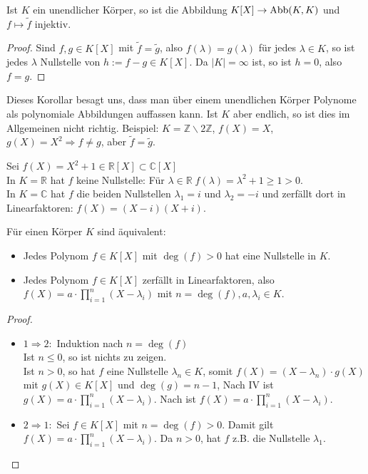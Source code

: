 \begin{conclusion}
	Ist $K$ ein unendlicher Körper, so ist die Abbildung $K[X] \to \operatorname{Abb}(K,K)$ und $f \mapsto
	\tilde f$ injektiv.
\end{conclusion}
\begin{proof}
	Sind $f,g \in K[X]$ mit $\tilde f = \tilde g$, also $f(\lambda)=g(\lambda)$ für jedes $\lambda \in K$, so ist
	jedes $\lambda$ Nullstelle von $h:= f-g \in K[X]$. Da $|K|=\infty$ ist, so ist $h=0$, also $f=g$.
\end{proof}

\begin{remark}
	Dieses Korollar besagt uns, dass man über einem unendlichen Körper Polynome als
	polynomiale Abbildungen auffassen kann. Ist $K$ aber endlich, so ist dies im Allgemeinen nicht richtig.
	Beispiel: $K=\mathbb Z\backslash 2\mathbb Z$, $f(X)=X$, $g(X)=X^2 \Rightarrow f \neq g$, aber 
	$\tilde f=\tilde g$.
\end{remark}

\begin{example}
	Sei $f(X)=X^2+1 \in \mathbb R[X] \subset \mathbb C[X]$ \\
	In $K=\mathbb R$ hat $f$ keine Nullstelle: Für $\lambda \in \mathbb R\; f(\lambda)=\lambda^2+1 \ge1 >0$. \\
	In $K=\mathbb C$ hat $f$ die beiden Nullstellen $\lambda_1=i$ und $\lambda_2=-i$ und zerfällt dort in Linearfaktoren:
	$f(X)=(X-i)(X+i)$.
\end{example}

\begin{proposition}
	Für einen Körper $K$ sind äquivalent:
	\begin{itemize}
		\item Jedes Polynom $f \in K[X]$ mit $\deg(f)>0$ hat eine Nullstelle in $K$.
		\item Jedes Polynom $f \in K[X]$ zerfällt in Linearfaktoren, also $f(X)=a\cdot \prod _{i=1}^n 
		(X-\lambda_i)$ mit $n=\deg(f), a, \lambda_i \in K$.
	\end{itemize}
\end{proposition}
\begin{proof}
	\begin{itemize}
		\item $1 \Rightarrow 2:$ Induktion nach $n=\deg(f)$ \\
		Ist $n\le0$, so ist nichts zu zeigen. \\
		Ist $n>0$, so hat $f$ eine Nullstelle $\lambda_n \in K$, somit $f(X)=(X-\lambda_n)\cdot g(X)$ mit $g(X) \in K[X]$
		und $\deg(g)=n-1$, Nach IV ist $g(X)=a\cdot \prod _{i=1}^n (X-\lambda_i)$. Nach  ist $f(X)=a\cdot \prod 
		_{i=1}^n (X-\lambda_i)$.
		\item $2 \Rightarrow 1:$ Sei $f \in K[X]$ mit $n=\deg(f)>0$. Damit gilt $f(X)=a\cdot \prod _{i=1}^n (X-\lambda_i)$.
		Da $n>0$, hat $f$ z.B. die Nullstelle $\lambda_1$.
	\end{itemize}
\end{proof}

